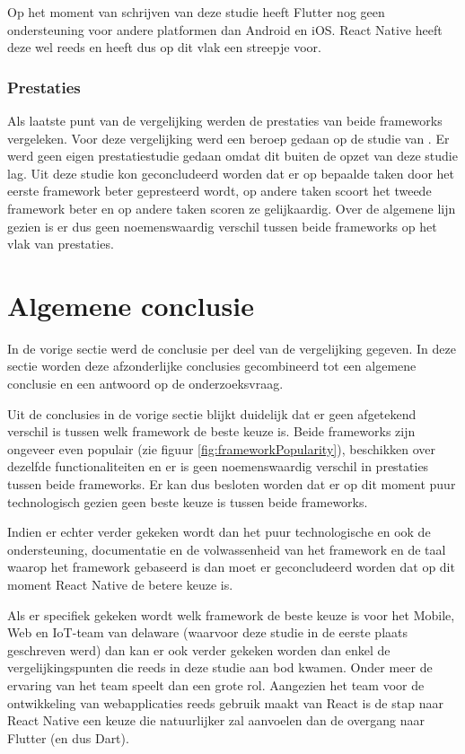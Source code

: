Op het moment van schrijven van deze studie heeft Flutter nog geen ondersteuning voor andere platformen dan Android en iOS. React Native heeft deze wel reeds en heeft dus op dit vlak een streepje voor.

\subsubsection{Prestaties}

Als laatste punt van de vergelijking werden de prestaties van beide frameworks vergeleken. Voor deze vergelijking werd een beroep gedaan op de studie van \textcite{Fentaw2020}. Er werd geen eigen prestatiestudie gedaan omdat dit buiten de opzet van deze studie lag. Uit deze studie kon geconcludeerd worden dat er op bepaalde taken door het eerste framework beter gepresteerd wordt, op andere taken scoort het tweede framework beter en op andere taken scoren ze gelijkaardig. Over de algemene lijn gezien is er dus geen noemenswaardig verschil tussen beide frameworks op het vlak van prestaties.

\section{Algemene conclusie}
\label{sec:AlgemeneConclusie}

In de vorige sectie werd de conclusie per deel van de vergelijking gegeven. In deze sectie worden deze afzonderlijke conclusies gecombineerd tot een algemene conclusie en een antwoord op de onderzoeksvraag.

Uit de conclusies in de vorige sectie blijkt duidelijk dat er geen afgetekend verschil is tussen welk framework de beste keuze is. Beide frameworks zijn ongeveer even populair (zie figuur \ref{fig:frameworkPopularity}), beschikken over dezelfde functionaliteiten en er is geen noemenswaardig verschil in prestaties tussen beide frameworks. Er kan dus besloten worden dat er op dit moment puur technologisch gezien geen beste keuze is tussen beide frameworks.

Indien er echter verder gekeken wordt dan het puur technologische en ook de ondersteuning, documentatie en de volwassenheid van het framework en de taal waarop het framework gebaseerd is dan moet er geconcludeerd worden dat op dit moment React Native de betere keuze is. 

Als er specifiek gekeken wordt welk framework de beste keuze is voor het Mobile, Web en IoT-team van delaware (waarvoor deze studie in de eerste plaats geschreven werd) dan kan er ook verder gekeken worden dan enkel de vergelijkingspunten die reeds in deze studie aan bod kwamen. Onder meer de ervaring van het team speelt dan een grote rol. Aangezien het team voor de ontwikkeling van webapplicaties reeds gebruik maakt van React is de stap naar React Native een keuze die natuurlijker zal aanvoelen dan de overgang naar Flutter (en dus Dart). 

